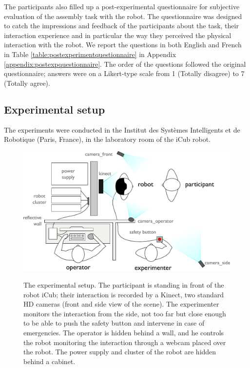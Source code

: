 The participants also filled up a post-experimental questionnaire for subjective evaluation of the assembly task with the robot.
The questionnaire was designed to catch the impressions and feedback of the participants about the task, their interaction experience and in particular the way they perceived the physical interaction with the robot. 
We report the questions in both English and French in Table \ref{table:postexperimentquestionnaire} in Appendix \ref{appendix:postexpquestionnaire}. 
The order of the questions followed the original questionnaire; answers were on a Likert-type scale from 1 (Totally disagree) to 7 (Totally agree). 




\subsection{Experimental setup}\label{sec:experimentalsetting}

The experiments were conducted in the Institut des Systèmes Intelligents et de Robotique (Paris, France), in the laboratory room of the iCub robot. 

\begin{figure}[ht!]
	\centering
	{
		\includegraphics[width=0.7\hsize]{Serena/figures/expe-setting.pdf}
	}
	\caption{The experimental setup. The participant is standing in front of the robot iCub; their interaction is recorded by a Kinect, two standard HD cameras (front and side view of the scene). The experimenter monitors the interaction from the side, not too far but close enough to be able to push the safety button and intervene in case of emergencies. The operator is hidden behind a wall, and he controls the robot monitoring the interaction through a webcam placed over the robot. The power supply and cluster of the robot are hidden behind a cabinet.}
	\label{fig:setup}
\end{figure}

